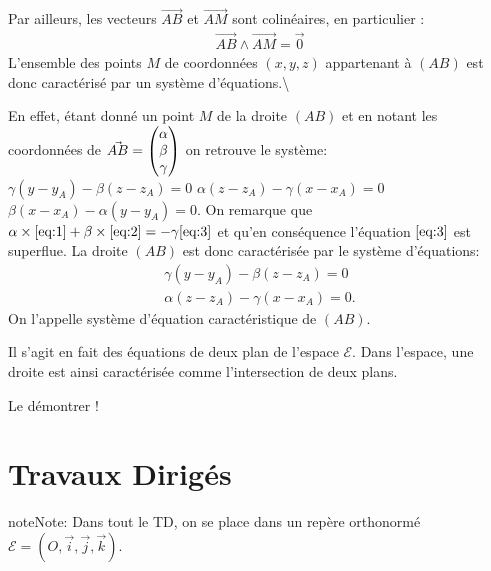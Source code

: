 \documentclass[letterpaper,10pt,english]{jupyterBook}
\begin{document}
\sphinxAtStartPar
Par ailleurs, les vecteurs \(\vec{AB}\) et \(\vec{AM}\) sont colinéaires, en particulier :
\begin{equation*}
\begin{split}
\vec{AB} \wedge \vec{AM} = \vec{0}
\end{split}
\end{equation*}
\sphinxAtStartPar
L’ensemble des points \(M\) de coordonnées \((x,y,z)\) appartenant à \((AB)\) est donc caractérisé par un système d’équations.\textbackslash{}

\sphinxAtStartPar
En effet, étant donné un point \(M\) de la droite \((AB)\) et en notant les coordonnées de \(\vec{AB} = \begin{pmatrix}\alpha\cr \beta \cr \gamma \end{pmatrix}\) on retrouve le système:
\(
\gamma(y-y_A) - \beta(z-z_A) = 0 \label{eq:1} \tag{1} 
\)
\(
\alpha(z-z_A)-\gamma(x-x_A)=0 \label{eq:2} \tag{2}
\)
\(
\beta(x-x_A) - \alpha (y-y_A)=0 \label{eq:3} \tag{3}.
\)
On remarque que \(\alpha \times \eqref{eq:1} + \beta \times \eqref{eq:2}  =-\gamma \eqref{eq:3}\) et qu’en conséquence l’équation \(\eqref{eq:3}\) est superflue. La droite \((AB)\) est donc caractérisée par le système d’équations:
\begin{equation*}
\begin{split}
\gamma(y-y_A) - \beta(z-z_A) = 0\\
\alpha(z-z_A)-\gamma(x-x_A)=0.
\end{split}
\end{equation*}
\sphinxAtStartPar
On l’appelle système d’équation caractéristique de \((AB)\).

\sphinxAtStartPar
{} Il s’agit en fait des équations de deux plan de l’espace \(\mathcal{E}\). Dans l’espace, une droite est ainsi caractérisée comme l’intersection de deux plans.

\sphinxAtStartPar
{} Le démontrer !


\chapter{Travaux Dirigés}
\label{\detokenize{Part1/TD:travaux-diriges}}\label{\detokenize{Part1/TD::doc}}
\begin{sphinxadmonition}{note}{Note:}
\sphinxAtStartPar
Dans tout le TD, on se place dans un repère orthonormé \(\mathcal{E} = (O,\vec{i},\vec{j},\vec{k})\).
\end{sphinxadmonition}
\end{document}
